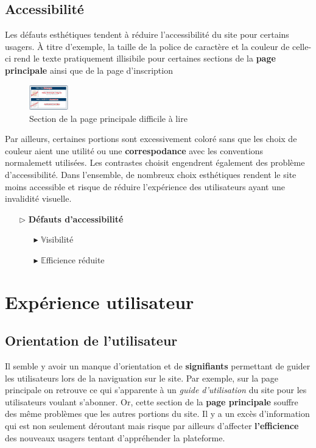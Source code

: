 \documentclass[9pt]{report}
\begin{document}
\begin{multicols*}{2}
  \subsection{Accessibilité}
  Les défauts esthétiques tendent à réduire l'accessibilité du site 
  pour certains usagers. À titre d'exemple, la taille de la police de 
  caractère et la couleur de celle-ci 
  rend le texte pratiquement illisibile pour certaines 
  sections de la \textbf{page principale} ainsi que de la page d'inscription 
  \begin{figure}[H]
    \begin{center}
      \includegraphics[width=0.15\textwidth]{PoliceIllisible.png}
    \end{center}
    \vspace{-1em}
    \caption{Section de la page principale difficile à lire}
  \end{figure}
  Par ailleurs, certaines portions sont excessivement coloré sans que 
  les choix de couleur aient une utilité ou une \textbf{correspodance}
  avec les conventions normalemett utilisées. Les contrastes choisit 
  engendrent également des problème d'accessibilité. Dans l'ensemble, 
  de nombreux choix esthétiques rendent le site moins accessible et 
  risque de réduire l'expérience des utilisateurs ayant une 
  invalidité visuelle. 
  \begin{itemize}
    \item [$\rhd$ ] \textbf{Défauts d'accessibilité}  
      \begin{itemize}
        \item [$\blacktriangleright$ ] $\mathbb{V}$isibilité
        \item [$\blacktriangleright$ ] $\mathbb{E}$fficience réduite
      \end{itemize}
  \end{itemize}


  \section{Expérience utilisateur}

  \subsection{Orientation de l'utilisateur}
    Il semble y avoir un manque d'orientation  
    et de \textbf{signifiants} permettant de guider les utilisateurs 
    lors de la naviguation sur le site. Par exemple, sur la 
    page principale on retrouve ce qui s'apparente à un 
    \textit{guide d'utilisation} du site pour les utilisateurs 
    voulant s'abonner. Or, cette section de la  
    \textbf{page principale}  souffre des même problèmes
    que les autres portions du site. Il y a un excès d'information 
    qui est non seulement déroutant mais risque 
    par ailleurs d'affecter \textbf{l'efficience}  
    des nouveaux usagers tentant d'appréhender la plateforme.


\end{multicols*}
\end{document}

